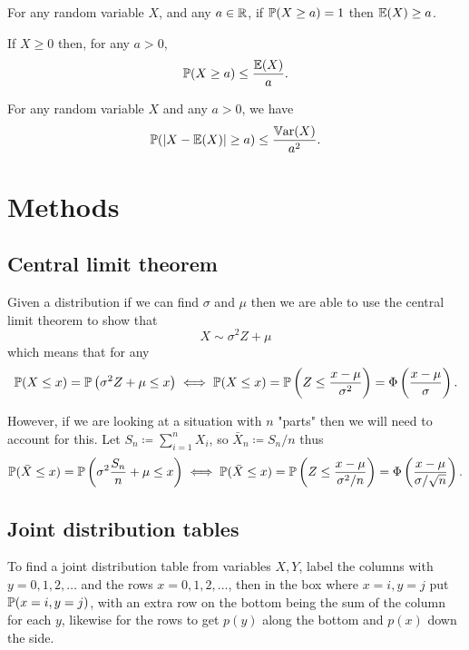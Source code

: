 \documentclass[10pt, a4paper]{article}
\begin{document}
\begin{theorem}
    For any random variable $X$,
    and any $a \in \R$,
    if $\P(X \geq a) = 1$ then $\E(X) \geq a$.
\end{theorem}

\begin{theorem}
    If $X \geq 0$ then,
    for any $a > 0$,
    \[
    \P(X \geq a) \leq \frac{\E(X)}{a}.
    \]
\end{theorem}

\begin{corollary}
    For any random variable $X$ and any $a > 0$,
    we have
    \[
    \P(|X - \E(X)| \geq a) \leq \frac{\Var(X)}{a ^ 2}.
    \]
\end{corollary}

\newpage

\section{Methods}

\subsection{Central limit theorem}
Given a distribution if we can find $\sigma$ and $\mu$ then we are able to use the central limit theorem to show that
\[
X \sim \sigma ^ 2 Z + \mu
\]
which means that for any
\[
\P(X \leq x) = \P\left(\sigma ^ 2 Z + \mu \leq x\right) \iff \P(X \leq x) = \P\left(Z \leq \frac{x - \mu}{\sigma ^ 2}\right) = \Phi\left(\frac{x - \mu}{\sigma}\right).
\]

However,
if we are looking at a situation with $n$ "parts" then we will need to account for this.
Let $S_n \coloneqq \sum_{i = 1}^{n}X_i$,
so $\bar{X}_n \coloneqq S_n / n$ thus
\[
\P(\bar{X} \leq x) = \P\left(\sigma ^ 2\frac{S_n}{n} + \mu \leq x\right) \iff \P(\bar{X} \leq x) = \P\left(Z \leq \frac{x - \mu}{\sigma ^ 2 / n}\right) = \Phi\left(\frac{x - \mu}{\sigma / \sqrt{n}}\right).
\]

\subsection{Joint distribution tables}
To find a joint distribution table from variables $X, Y$,
label the columns with $y = 0, 1, 2, \dotsc$ and the rows $x = 0, 1, 2, \dotsc$,
then in the box where $x = i, y = j$ put $\P(x = i, y = j)$,
with an extra row on the bottom being the sum of the column for each $y$,
likewise for the rows to get $p(y)$ along the bottom and $p(x)$ down the side.
\end{document}
